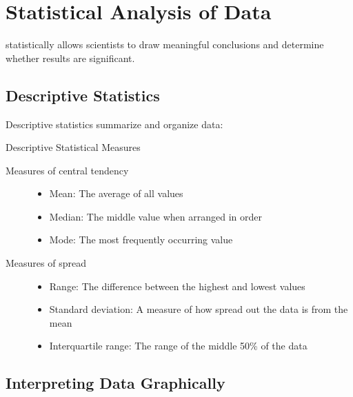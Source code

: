 \section{Statistical Analysis of Data}

 statistically allows scientists to draw meaningful conclusions and determine whether results are significant.

\subsection{Descriptive Statistics}

Descriptive statistics summarize and organize data:

\begin{keyconcept}{Descriptive Statistical Measures}
\begin{description}
    \item[Measures of central tendency] 
    \begin{itemize}
        \item Mean: The average of all values
        \item Median: The middle value when arranged in order
        \item Mode: The most frequently occurring value
    \end{itemize}
    
    \item[Measures of spread] 
    \begin{itemize}
        \item Range: The difference between the highest and lowest values
        \item Standard deviation: A measure of how spread out the data is from the mean
        \item Interquartile range: The range of the middle 50\% of the data
    \end{itemize}
\end{description}
\end{keyconcept}


\subsection{Interpreting Data Graphically}

